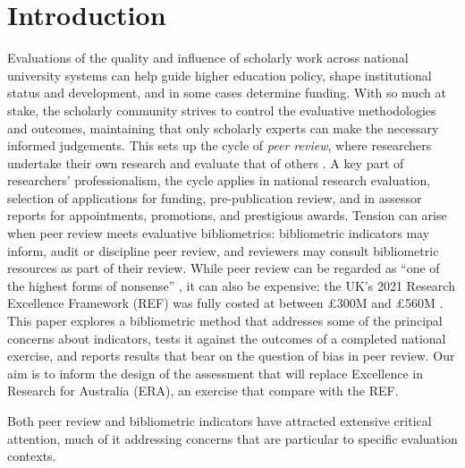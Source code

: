 \section{Introduction}
\label{sec:introduction}

Evaluations of the quality and influence of scholarly work across national university systems can help guide higher education policy, shape institutional status and development, and in some cases determine funding.  With so much at stake, the scholarly community strives to control the evaluative methodologies and outcomes, maintaining that only scholarly experts can make the necessary informed judgements. This sets up the cycle of \textit{peer review}, where researchers undertake their own research and evaluate that of others \citep{woodPeerReviewProcess1997a}. A key part of researchers' professionalism, the cycle applies in national research evaluation, selection of applications for funding, pre-publication review, and in assessor reports for appointments, promotions, and prestigious awards. Tension can arise when peer review meets evaluative bibliometrics: bibliometric indicators may inform, audit or discipline peer review, and reviewers may consult bibliometric resources as part of their review. While peer review can be regarded as \enquote{one of the highest forms of nonsense} \citep[][p. 14]{zimanCollectivizationScienceBernal1983}, it can also be expensive: the UK's 2021 Research Excellence Framework (REF) was fully costed at between \pounds 300M and \pounds 560M \citep{netoREF2021Cost2023}. This paper explores a bibliometric method that addresses some of the principal concerns about indicators, tests it against the outcomes of a completed national exercise, and reports results that bear on the question of bias in peer review. Our aim is to inform the design of the assessment that will replace Excellence in Research for Australia (ERA), an exercise that \citet{baghjanatiComparativeStudyResearch2025} compare with the REF.

Both peer review and bibliometric indicators have attracted extensive critical attention, much of it addressing concerns that are particular to specific evaluation contexts. 

